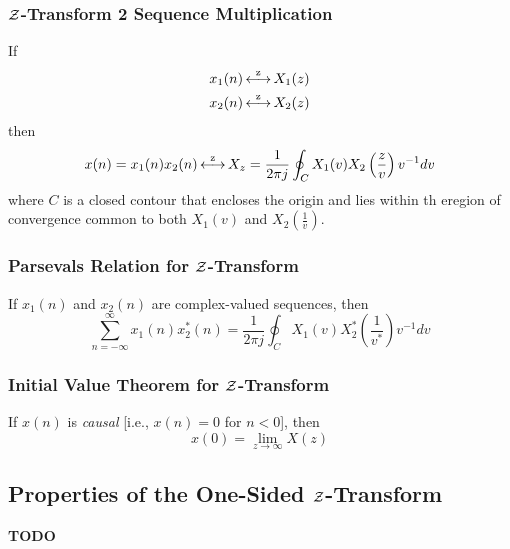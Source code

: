 \subsubsection{\texorpdfstring{$\operatorname{\mathcal{Z}}$-Transform}{Z-Transform} 2 Sequence Multiplication}\label{subsubsec:Z-Transform 2 Sequence Multiplication}
If
\begin{equation*}
  \begin{aligned}
    x_{1}(n) &\operatorname{\overset{z}{\longleftrightarrow}} X_{1}(z) \\
    x_{2}(n) &\operatorname{\overset{z}{\longleftrightarrow}} X_{2}(z) \\
  \end{aligned}
\end{equation*}
then
\begin{equation}\label{eq:Z-Transform 2 Sequence Multiplication}
  x(n) = x_{1}(n)x_{2}(n) \operatorname{\overset{z}{\longleftrightarrow}} X_{z} = \frac{1}{2 \pi j} \oint_{C} X_{1}(v)X_{2}\left( \frac{z}{v} \right) v^{-1} dv
\end{equation}
where $C$ is a closed contour that encloses the origin and lies within th eregion of convergence common to both $X_{1}(v)$ and $X_{2}(\frac{1}{v})$.

\subsubsection{Parsevals Relation for \texorpdfstring{$\operatorname{\mathcal{Z}}$-Transform}{Z-Transform}}\label{subsubsec:Parsevals Relation for Z-Transform}
If $x_{1}(n)$ and $x_{2}(n)$ are complex-valued sequences, then
\begin{equation}\label{eq:Parsevals Relation for Z-Transform}
  \sum\limits_{n=-\infty}^{\infty} x_{1}(n)x_{2}^{*}(n) = \frac{1}{2 \pi j} \oint_{C} X_{1}(v)X_{2}^{*} \left( \frac{1}{v^{*}} \right) v^{-1} dv
\end{equation}

\subsubsection{Initial Value Theorem for \texorpdfstring{$\operatorname{\mathcal{Z}}$-Transform}{Z-Transform}}\label{subsubsec:Initial Value Theorem for Z-Transform}
If $x(n)$ is \emph{causal} [i.e., $x(n)=0$ for $n<0$], then
\begin{equation}\label{eq:Initial Value Theorem for Z-Transform}
  x(0) = \lim\limits_{z\rightarrow\infty}X(z)
\end{equation}

\subsection{Properties of the One-Sided \texorpdfstring{$\operatorname{\mathcal{Z}}$-Transform}{Z-Transform}}\label{subsec:One-Sided Z-Transform Properties}
\textbf{TODO}


